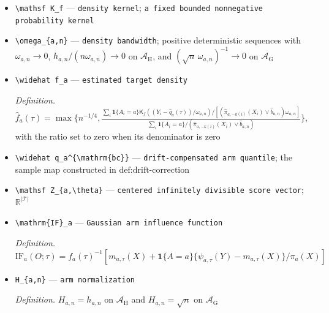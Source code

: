 \documentclass{article}
\begin{document}
\begin{itemize}
  \par\smallskip\noindent\emph{Definition.} \(\widehat m^{\mathrm{tail}}_{a,\tau}=\frac{\sum_{i=1}^n\mathbf1\{A_i=a,\widehat\pi_{a,-k(i)}(X_i)\le\widehat p_{a,(k_n)}\}\widetilde\psi_{a,\tau,-k(i)}(Y_i)}{\sum_{i=1}^n\mathbf1\{A_i=a,\widehat\pi_{a,-k(i)}(X_i)\le\widehat p_{a,(k_n)}\}}\), with value zero when the denominator is zero
  \item \texttt{\textbackslash{}\allowbreak{}mathsf K\_\allowbreak{}f} --- \texttt{density kernel}; \texttt{a fixed bounded nonnegative probability kernel}
  \item \texttt{\textbackslash{}\allowbreak{}omega\_\allowbreak{}\{a,\allowbreak{}n\}\allowbreak{}} --- \texttt{density bandwidth}; positive deterministic sequences with \(\omega_{a,n}\to0\), \(h_{a,n}/(n\omega_{a,n})\to0\) on \(\mathcal A_{\mathrm H}\), and \((\sqrt n\,\omega_{a,n})^{-1}\to0\) on \(\mathcal A_{\mathrm G}\)
  \item \texttt{\textbackslash{}\allowbreak{}widehat f\_\allowbreak{}a} --- \texttt{estimated target density}
  \par\smallskip\noindent\emph{Definition.} \(\widehat f_a(\tau)=\max\{n^{-1/4},\frac{\sum_i\mathbf1\{A_i=a\}\mathsf K_f((Y_i-\widehat q_a(\tau))/\omega_{a,n})/[(\widehat\pi_{a,-k(i)}(X_i)\vee\widehat b_{a,n})\omega_{a,n}]}{\sum_i\mathbf1\{A_i=a\}/(\widehat\pi_{a,-k(i)}(X_i)\vee\widehat b_{a,n})}\}\), with the ratio set to zero when its denominator is zero
  \item \texttt{\textbackslash{}\allowbreak{}widehat q\_\allowbreak{}a\textasciicircum{}\{\textbackslash{}\allowbreak{}mathrm\{bc\}\allowbreak{}\}\allowbreak{}} --- \texttt{drift-\allowbreak{}compensated arm quantile}; the sample map constructed in \(\text{def:drift-correction}\)
  \item \texttt{\textbackslash{}\allowbreak{}mathsf Z\_\allowbreak{}\{a,\allowbreak{}\textbackslash{}\allowbreak{}theta\}\allowbreak{}} --- \texttt{centered infinitely divisible score vector}; \(\mathbb R^{|\mathcal T|}\)
  \item \texttt{\textbackslash{}\allowbreak{}mathrm\{IF\}\allowbreak{}\_\allowbreak{}a} --- \texttt{Gaussian arm influence function}
  \par\smallskip\noindent\emph{Definition.} \(\mathrm{IF}_a(O;\tau)=f_a(\tau)^{-1}[m_{a,\tau}(X)+\mathbf1\{A=a\}\{\psi_{a,\tau}(Y)-m_{a,\tau}(X)\}/\pi_a(X)]\)
  \item \texttt{H\_\allowbreak{}\{a,\allowbreak{}n\}\allowbreak{}} --- \texttt{arm normalization}
  \par\smallskip\noindent\emph{Definition.} \(H_{a,n}=h_{a,n}\) on \(\mathcal A_{\mathrm H}\) and \(H_{a,n}=\sqrt n\) on \(\mathcal A_{\mathrm G}\)

\end{itemize}
\end{document}
